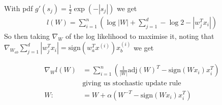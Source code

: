 %
%
\begin{answer}
With pdf $g'(s_j) = \frac{1}{2} \exp(-|s_j|)$ we get
\begin{align*}
l(W) 
= \sum_{i=1}^n \left ( 
\log |W| + \sum_{j=1}^d -\log 2 - |w_j^T x_i|
\right)
\end{align*}
So then taking $\nabla_W$ of the log  likelihood to maximise it, noting that $\nabla_{W_{ab}} \sum_{j=1}^d |w_j^T x_i| = \text{sign}(w_a^T x^{(i)}) x^{(i)}_b$
we get

\begin{align*}
\nabla_W l(W) &=
\sum_{i=1}^n \left ( 
\frac{1}{|W|} \text{adj}(W)^T - \text{sign} (W x_i)x_i^T
\right)
\\
&\text{giving us stochastic update rule}
\\ W :&= W + \alpha (
	W^{-T} - \text{sign}(W x_i) x_i^T
)
\end{align*}

\end{answer}
%
